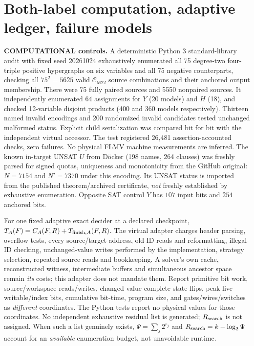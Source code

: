 \documentclass[11pt]{article}
\newcommand{\CM}{\mathcal C_{\mathrm{M22}}}
\begin{document}
\section{Both-label computation, adaptive ledger, failure models}
\noindent\textbf{COMPUTATIONAL controls.} A deterministic Python 3 standard-library audit with fixed seed 20261024 exhaustively enumerated all 75 degree-two four-triple positive hypergraphs on six variables and all 75 negative counterparts, checking all \(75^2=5625\) valid \(\CM\) source combinations and their anchored output membership. There were 75 fully paired sources and 5550 nonpaired sources. It independently enumerated 64 assignments for \(Y\) (20 models) and \(H\) (18), and checked 12-variable disjoint products (400 and 360 models respectively). Thirteen named invalid encodings and 200 randomized invalid candidates tested unchanged malformed status. Explicit child serialization was compared bit for bit with the independent virtual accessor. The test registered 26,481 assertion-accounted checks, zero failures. No physical FLMV machine measurements are inferred. The known in-target UNSAT \(U\) from D\"ocker (198 names, 264 clauses) was freshly parsed for signed quotas, uniqueness and monotonicity from the GitHub original: \(N=7154\) and \(N'=7370\) under this encoding. Its UNSAT status is imported from the published theorem/archived certificate, \emph{not} freshly established by exhaustive enumeration. Opposite SAT control \(Y\) has \(107\) input bits and \(254\) anchored bits.

For one fixed adaptive exact decider at a declared checkpoint, \(T_A(F)=C_A(F,R)+T_{{\rm finish},A}(F,R)\). The virtual adapter charges header parsing, overflow tests, every source/target address, old-ID reads and reformatting, illegal-ID checking, unchanged-value writes performed by the implementation, strategy selection, repeated source reads and bookkeeping. A solver's own cache, reconstructed witness, intermediate buffers and simultaneous ancestor space remain \emph{its} costs; this adapter does not mandate them. Report primitive bit work, source/workspace reads/writes, changed-value complete-state flips, peak live writable/index bits, cumulative bit-time, program size, and gates/wires/switches as \emph{different} coordinates. The Python tests report no physical values for those coordinates. No independent exhaustive residual list is generated; \(R_{\rm search}\) is not assigned. When such a list genuinely exists, \(\Psi=\sum_j2^{r_j}\) and \(R_{\rm search}=k-\log_2\Psi\) account for an \emph{available} enumeration budget, not unavoidable runtime.
\end{document}
